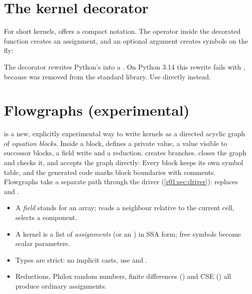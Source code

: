 \section{The kernel decorator}

For short kernels,  offers a compact notation. The operator 
inside the decorated function creates an assignment, and an optional argument
 creates symbols on the fly:

\begin{pitfall}
  The decorator rewrites Python's  into a . On
  Python 3.14 this rewrite fails with , because  was removed from the
  standard library. Use  directly instead.
\end{pitfall}

\section{Flowgraphs (experimental)}\label{r01:sec:flow}

 is a new, explicitly experimental way to write kernels as a directed
acyclic graph of \emph{equation blocks}. Inside a block, 
defines a private value,  a value visible to successor
blocks,  a field write and 
a reduction.  creates branches.  closes the graph
and checks it, and  accepts the graph directly:
Every block keeps its own symbol table, and the generated code marks block boundaries
with comments. Flowgraphs take a separate path through the driver
(\cref{r01:sec:driver}):  replaces  and
.

\begin{keyidea}[Summary]
  \begin{itemize}[leftmargin=1.2em]
    \item A \emph{field} stands for an array;  reads a neighbour relative
          to the current cell,  selects a component.
    \item A kernel is a list of \emph{assignments} (or an ) in
          SSA form; free symbols become scalar parameters.
    \item Types are strict: no implicit casts, use  and .
    \item Reductions, Philox random numbers, finite differences () and CSE
          () all produce ordinary assignments.
  \end{itemize}
\end{keyidea}
